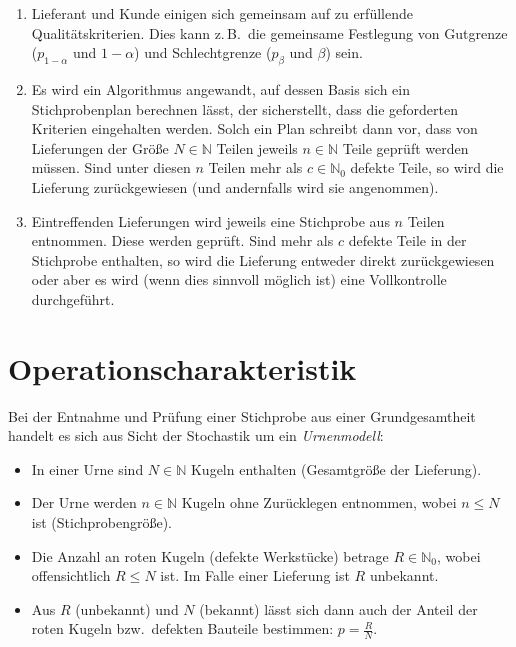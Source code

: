\documentclass[a4paper,11pt,oneside]{article}
\begin{document}
\begin{enumerate}
\item
Lieferant und Kunde einigen sich gemeinsam auf zu erfüllende Qualitätskriterien. Dies kann z.\,B.\ die gemeinsame Festlegung von Gutgrenze ($p_{1-\alpha}$ und $1-\alpha$) und Schlechtgrenze ($p_\beta$ und $\beta$) sein.
\item
Es wird ein Algorithmus angewandt, auf dessen Basis sich ein Stichprobenplan berechnen lässt, der sicherstellt, dass die geforderten Kriterien eingehalten werden. Solch ein Plan schreibt dann vor, dass von Lieferungen der Größe $N\in\mathbb N$ Teilen jeweils $n\in\mathbb N$ Teile geprüft werden müssen. Sind unter diesen $n$ Teilen mehr als $c\in\mathbb N_0$ defekte Teile, so wird die Lieferung zurückgewiesen (und andernfalls wird sie angenommen).
\item
Eintreffenden Lieferungen wird jeweils eine Stichprobe aus $n$ Teilen entnommen. Diese werden geprüft. Sind mehr als $c$ defekte Teile in der Stichprobe enthalten, so wird die Lieferung entweder direkt zurückgewiesen oder aber es wird (wenn dies sinnvoll möglich ist) eine Vollkontrolle durchgeführt.
\end{enumerate}



\section{Operationscharakteristik}

Bei der Entnahme und Prüfung einer Stichprobe aus einer Grundgesamtheit handelt es sich aus Sicht der Stochastik um ein \emph{Urnenmodell}:

\begin{itemize}
\item
In einer Urne sind $N\in\mathbb N$ Kugeln enthalten (Gesamtgröße der Lieferung).
\item
Der Urne werden $n\in\mathbb N$ Kugeln ohne Zurücklegen entnommen, wobei $n\le N$ ist (Stichprobengröße).
\item
Die Anzahl an roten Kugeln (defekte Werkstücke) betrage $R\in\mathbb N_0$, wobei offensichtlich $R\le N$ ist. Im Falle einer Lieferung ist $R$ unbekannt.
\item
Aus $R$ (unbekannt) und $N$ (bekannt) lässt sich dann auch der Anteil der roten Kugeln bzw.\ defekten Bauteile bestimmen: $p=\frac{R}{N}$.
\end{itemize}
\end{document}
